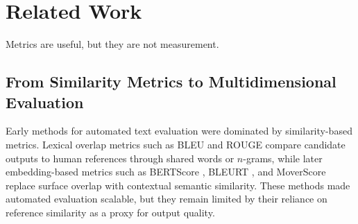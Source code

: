 
\section{Related Work}

Metrics are useful, but they are not measurement.


\subsection{From Similarity Metrics to Multidimensional Evaluation}

Early methods for automated text evaluation were dominated by similarity-based metrics. Lexical overlap metrics such as BLEU \citep{papineni_bleu_2001} and ROUGE \citep{lin_rouge_2004} compare candidate outputs to human references through shared words or $n$-grams, while later embedding-based metrics such as BERTScore \citep{zhang_bertscore_2020}, BLEURT \citep{sellam_bleurt_2020}, and MoverScore \citep{zhao_moverscore_2019} replace surface overlap with contextual semantic similarity. These methods made automated evaluation scalable, but they remain limited by their reliance on reference similarity as a proxy for output quality.